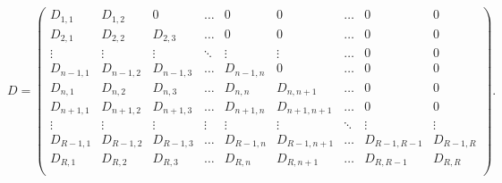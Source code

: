 \noindent


$$


D=


  \begin{pmatrix}


D_{1,1}      & D_{1,2}      &  0          & \ldots &  0         &  0


               & \ldots & 0 & 0    \\


D_{2,1}      & D_{2,2}      & D_{2,3}      & \ldots &  0         &  0


               & \ldots & 0 & 0    \\


\vdots      & \vdots      & \vdots      & \ddots & \vdots     & \vdots


               & \ldots & 0 & 0 \\


D_{n-1,1}   & D_{n-1,2}   & D_{n-1,3}   & \ldots & D_{n-1,n}  &  0


               & \ldots & 0 & 0    \\


D_{n,1}      & D_{n,2}      & D_{n,3}      & \ldots & D_{n,n}     &


D_{n,n+1}


               & \ldots & 0 & 0  \\


D_{n+1,1}   & D_{n+1,2}   & D_{n+1,3}   & \ldots & D_{n+1,n}  & D_{n+1,n+1}


               & \ldots & 0 & 0  \\


\vdots      & \vdots      & \vdots      & \vdots & \vdots      & \vdots


               & \ddots & \vdots &\vdots  \\


D_{R-1,1} & D_{R-1,2} & D_{R-1,3} & \ldots & D_{R-1,n} & D_{R-1,n+1}


               & \ldots & D_{R-1,R-1}  & D_{R-1,R} \\


D_{R,1}   & D_{R,2}   & D_{R,3}   & \ldots & D_{R,n}   & D_{R,n+1}


               & \ldots & D_{R,R-1}  & D_{R,R} \\


\end{pmatrix}.


$$


\smallskip


